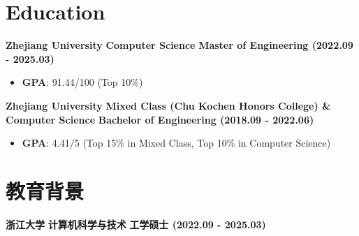 \ifdefined\english

    \section*{Education}

    \noindent \textbf{Zhejiang University} \textbar{} \textbf{Computer Science} \textbar{} \textbf{Master of
    Engineering (2022.09 - 2025.03)}

    \begin{itemize}
        \item \textbf{GPA}: 91.44/100 (Top 10\%)
    \end{itemize}

    \noindent \textbf{Zhejiang University} \textbar{} \textbf{Mixed Class (Chu Kochen Honors College) \& Computer
    Science} \textbar{} \textbf{Bachelor of Engineering (2018.09 - 2022.06)}

    \begin{itemize}
        \item \textbf{GPA}: 4.41/5 (Top 15\% in Mixed Class, Top 10\% in Computer Science)
    \end{itemize}

\else

    \section*{教育背景}

    \noindent \textbf{浙江大学} \textbar{} \textbf{计算机科学与技术} \textbar{} \textbf{工学硕士 (2022.09 - 2025.03)}

